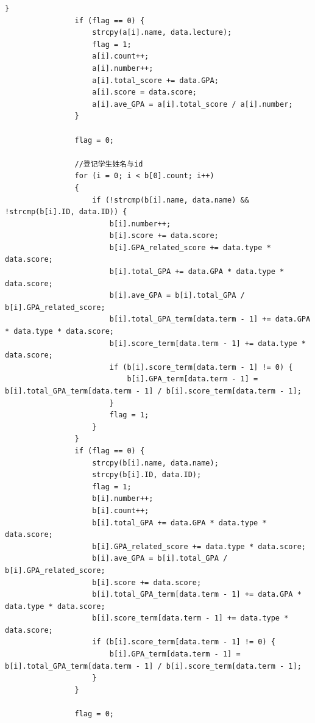 \documentclass[fontset=windows]{article}
\begin{document}
\begin{lstlisting}[style = {cppstyle}]
				}
				if (flag == 0) {
					strcpy(a[i].name, data.lecture);
					flag = 1;
					a[i].count++;
					a[i].number++;
					a[i].total_score += data.GPA;
					a[i].score = data.score;
					a[i].ave_GPA = a[i].total_score / a[i].number;
				}
	
				flag = 0;
	
				//登记学生姓名与id
				for (i = 0; i < b[0].count; i++)
				{
					if (!strcmp(b[i].name, data.name) && !strcmp(b[i].ID, data.ID)) {
						b[i].number++;
						b[i].score += data.score;
						b[i].GPA_related_score += data.type * data.score;
						b[i].total_GPA += data.GPA * data.type * data.score;
						b[i].ave_GPA = b[i].total_GPA / b[i].GPA_related_score;
						b[i].total_GPA_term[data.term - 1] += data.GPA * data.type * data.score;
						b[i].score_term[data.term - 1] += data.type * data.score;
						if (b[i].score_term[data.term - 1] != 0) {
							b[i].GPA_term[data.term - 1] = b[i].total_GPA_term[data.term - 1] / b[i].score_term[data.term - 1];
						}
						flag = 1;
					}
				}
				if (flag == 0) {
					strcpy(b[i].name, data.name);
					strcpy(b[i].ID, data.ID);
					flag = 1;
					b[i].number++;
					b[i].count++;
					b[i].total_GPA += data.GPA * data.type * data.score;
					b[i].GPA_related_score += data.type * data.score;
					b[i].ave_GPA = b[i].total_GPA / b[i].GPA_related_score;
					b[i].score += data.score;
					b[i].total_GPA_term[data.term - 1] += data.GPA * data.type * data.score;
					b[i].score_term[data.term - 1] += data.type * data.score;
					if (b[i].score_term[data.term - 1] != 0) {
						b[i].GPA_term[data.term - 1] = b[i].total_GPA_term[data.term - 1] / b[i].score_term[data.term - 1];
					}
				}
	
				flag = 0;
	

\end{lstlisting}
\end{document}
